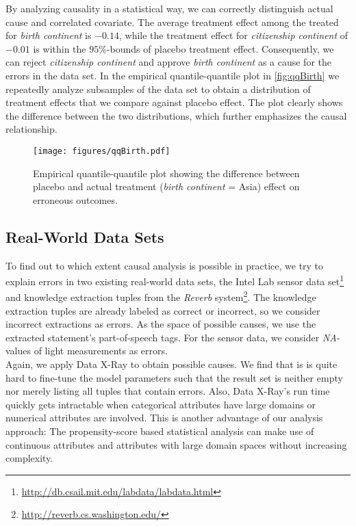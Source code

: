 \documentclass[acmsmall, nonacm, screen]{acmart} %
\begin{document}
By analyzing causality in a statistical way, we can correctly distinguish actual cause and correlated covariate. The average treatment effect among the treated for \textit{birth continent} is $-0.14$, while the treatment effect for \textit{citizenship continent} of $-0.01$ is within the $95\%$-bounds of placebo treatment effect.
Consequently, we can reject \textit{citizenship continent} and approve \textit{birth continent} as a cause for the errors in the data set.
In the empirical quantile-quantile plot in \autoref{fig:qqBirth} we repeatedly analyze subsamples of the data set to obtain a distribution of treatment effects that we compare against placebo effect.
The plot clearly shows the difference between the two distributions, which further emphasizes the causal relationship.
\begin{figure}[htbp]
\texttt{[image: figures/qqBirth.pdf]}
\caption{Empirical quantile-quantile plot showing the difference between placebo and actual treatment (\textit{birth continent} = Asia) effect on erroneous outcomes.}
\label{fig:qqBirth}
\end{figure}


\subsection{Real-World Data Sets}
To find out to which extent causal analysis is possible in practice, we try to explain errors in two existing real-world data sets, the Intel Lab sensor data set\footnote{\url{http://db.csail.mit.edu/labdata/labdata.html}} and knowledge extraction tuples from the \textit{Reverb} system\footnote{\url{http://reverb.cs.washington.edu/}}. 
The knowledge extraction tuples are already labeled as correct or incorrect, so we consider incorrect extractions as errors. As the space of possible causes, we use the extracted statement's part-of-speech tags. For the sensor data, we consider \textit{NA}-values of light measurements as errors.\\

Again, we apply Data X-Ray to obtain possible causes. We find that is is quite hard to fine-tune the model parameters such that the result set is neither empty nor merely listing all tuples that contain errors.
Also, Data X-Ray's run time quickly gets intractable when categorical attributes have large domains or numerical attributes are involved.
This is another advantage of our analysis approach: The propensity-score based statistical analysis can make use of continuous attributes and attributes with large domain spaces without increasing complexity.\\
\end{document}
